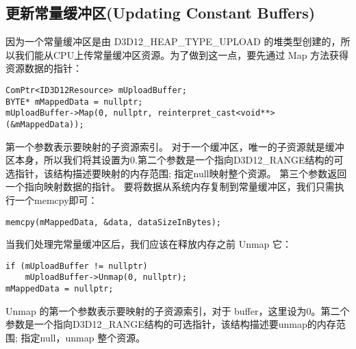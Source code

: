 \subsection{更新常量缓冲区(Updating Constant Buffers)}
\begin{flushleft}
因为一个常量缓冲区是由 D3D12\_HEAP\_TYPE\_UPLOAD 的堆类型创建的，所以我们能从CPU上传常量缓冲区资源。为了做到这一点，要先通过 Map 方法获得资源数据的指针：\\
\begin{lstlisting}
ComPtr<ID3D12Resource> mUploadBuffer;
BYTE* mMappedData = nullptr;
mUploadBuffer->Map(0, nullptr, reinterpret_cast<void**>(&mMappedData));
\end{lstlisting}
第一个参数表示要映射的子资源索引。 对于一个缓冲区，唯一的子资源就是缓冲区本身，所以我们将其设置为0.第二个参数是一个指向D3D12\_RANGE结构的可选指针，该结构描述要映射的内存范围; 指定null映射整个资源。 第三个参数返回一个指向映射数据的指针。 要将数据从系统内存复制到常量缓冲区，我们只需执行一个memcpy即可：\\
\begin{lstlisting}
memcpy(mMappedData, &data, dataSizeInBytes);
\end{lstlisting}
当我们处理完常量缓冲区后，我们应该在释放内存之前 Unmap 它：\\
\begin{lstlisting}
if (mUploadBuffer != nullptr)
    mUploadBuffer->Unmap(0, nullptr);
mMappedData = nullptr;
\end{lstlisting}
Unmap 的第一个参数表示要映射的子资源索引，对于 buffer，这里设为0。第二个参数是一个指向D3D12\_RANGE结构的可选指针，该结构描述要unmap的内存范围; 指定null，unmap 整个资源。
\end{flushleft}

